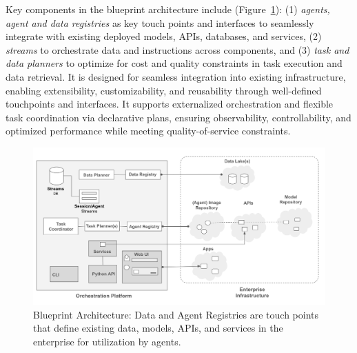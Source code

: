 Key components in the blueprint architecture include (Figure~\ref{fig:architecture}): (1) \emph{agents, agent and data registries} as key touch points and interfaces to seamlessly integrate with existing deployed models, APIs, databases, and services, (2) \emph{streams} to orchestrate data and instructions across components, and (3) \emph{task and data planners} to optimize for cost and quality constraints in task execution and data retrieval.
%
It is designed for seamless integration into existing infrastructure, enabling extensibility, customizability, and reusability through well-defined touchpoints and interfaces. It supports externalized orchestration and flexible task coordination via declarative plans, ensuring observability, controllability, and optimized performance while meeting quality-of-service constraints.



\begin{figure}[!htb] 
  \vspace{-10pt}
  \centering
  \includegraphics[width=\linewidth]{submissions/Estevam2024/figures/architecture.png}
  \caption{Blueprint Architecture: Data and Agent Registries are touch points that define existing data, models, APIs, and services in the enterprise for utilization by agents.}
  \label{fig:architecture} 
  \vspace{-15pt}
\end{figure}

